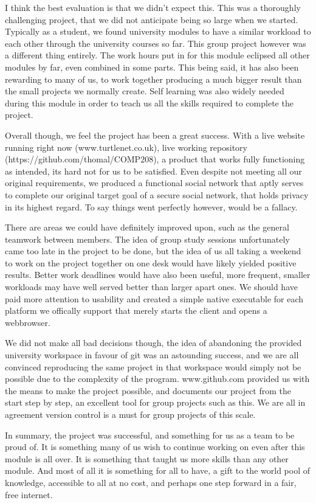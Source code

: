 I think the best evaluation is that we didn't expect this. This was a thoroughly 
challenging project, that we did not anticipate being so large when we started.
Typically as a student, we found university modules to have a similar workload to 
each other through the university courses so far. This group project however was 
a different thing entirely. The work hours put in for this module eclipsed all 
other modules by far, even combined in some parts. This being said, it has also 
been rewarding to many of us, to work together producing a much bigger result than
the small projects we normally create. Self learning was also widely needed during 
this module in order to teach us all the skills required to complete the project. 
\par

Overall though, we feel the project has been a great success. With a live website 
running right now (www.turtlenet.co.uk), live working repository 
(https://github.com/thomal/COMP208), a product that works fully functioning as 
intended, its hard not for us to be satisfied. Even despite not meeting all our 
original requirements, we produced a functional social network that aptly serves
to complete our original target goal of a secure social network, that holds privacy
in its highest regard. To say things went perfectly however, would be a fallacy.
\par

There are areas we could have definitely improved upon, such as the general 
teamwork between members. The idea of group study sessions unfortunately came too
late in the project to be done, but the idea of us all taking a weekend to work on
the project together on one desk would have likely yielded positive results. 
Better work deadlines would have also been useful, more frequent, smaller workloads 
may have well served better than larger apart ones. We should have paid more
attention to usability and created a simple native executable for each platform
we offically support that merely starts the client and opens a webbrowser.
\par

We did not make all bad decisions though, the idea of abandoning the provided 
university workspace in favour of git was an astounding success, and we are all
convinced reproducing the same project in that workspace would simply not be 
possible due to the complexity of the program. www.github.com provided us with the 
means to make the project possible, and documents our project from the start 
step by step, an excellent tool for group projects such as this. We are all in 
agreement version control is a must for group projects of this scale.
\par

In summary, the project was successful, and something for us as a team to be 
proud of. It is something many of us wish to continue working on even after 
this module is all over. It is something that taught us more skills than any
other module. And most of all it is something for all to have, a gift to the 
world pool of knowledge, accessible to all at no cost, and perhaps one step 
forward in a fair, free internet.
